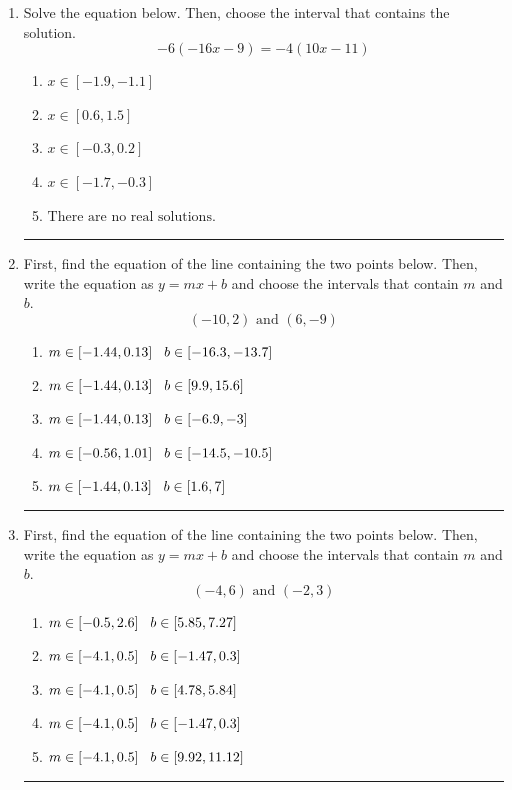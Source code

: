 \documentclass[14pt]{extbook}
\newcommand{\litem}[1]{\item#1\hspace*{-1cm}\rule{\textwidth}{0.4pt}}
\begin{document}
\begin{enumerate}
{\begin{enumerate}[label=\Alph*.]
\end{enumerate} }
\litem{
Solve the equation below. Then, choose the interval that contains the solution.\[ -6(-16x -9) = -4(10x -11) \]\begin{enumerate}[label=\Alph*.]
\item \( x \in [-1.9, -1.1] \)
\item \( x \in [0.6, 1.5] \)
\item \( x \in [-0.3, 0.2] \)
\item \( x \in [-1.7, -0.3] \)
\item \( \text{There are no real solutions.} \)

\end{enumerate} }
\litem{
First, find the equation of the line containing the two points below. Then, write the equation as $ y=mx+b $ and choose the intervals that contain $m$ and $b$.\[ (-10, 2) \text{ and } (6, -9) \]\begin{enumerate}[label=\Alph*.]
\item \( m \in [-1.44, 0.13] \hspace*{3mm} b \in [-16.3, -13.7] \)
\item \( m \in [-1.44, 0.13] \hspace*{3mm} b \in [9.9, 15.6] \)
\item \( m \in [-1.44, 0.13] \hspace*{3mm} b \in [-6.9, -3] \)
\item \( m \in [-0.56, 1.01] \hspace*{3mm} b \in [-14.5, -10.5] \)
\item \( m \in [-1.44, 0.13] \hspace*{3mm} b \in [1.6, 7] \)

\end{enumerate} }
\litem{
First, find the equation of the line containing the two points below. Then, write the equation as $ y=mx+b $ and choose the intervals that contain $m$ and $b$.\[ (-4, 6) \text{ and } (-2, 3) \]\begin{enumerate}[label=\Alph*.]
\item \( m \in [-0.5, 2.6] \hspace*{3mm} b \in [5.85, 7.27] \)
\item \( m \in [-4.1, 0.5] \hspace*{3mm} b \in [-1.47, 0.3] \)
\item \( m \in [-4.1, 0.5] \hspace*{3mm} b \in [4.78, 5.84] \)
\item \( m \in [-4.1, 0.5] \hspace*{3mm} b \in [-1.47, 0.3] \)
\item \( m \in [-4.1, 0.5] \hspace*{3mm} b \in [9.92, 11.12] \)


\end{enumerate}}
\end{enumerate}
\end{document}
